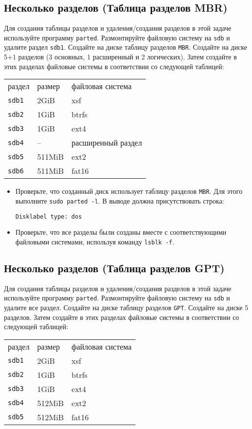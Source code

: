 \documentclass{article}
\begin{document}
\subsection{Несколько разделов (Таблица разделов MBR)}
Для создания таблицы разделов и удаления/создания разделов в этой задаче используйте программу \texttt{parted}. Размонтируйте файловую систему на \texttt{sdb} и удалите раздел \texttt{sdb1}. Создайте на диске таблицу разделов \texttt{MBR}. Создайте на диске 5+1 разделов (3 основных, 1 расширенный и 2 логических). Затем создайте в этих разделах файловые системы в соответствии со следующей таблицей:
\begin{center}
\begin{tabular}{lll}
 раздел & размер  	& файловая система   \\
 \texttt{sdb1} 	& 2GiB 		& xsf   \\
 \texttt{sdb2} 	& 1GiB 		& btrfs \\
 \texttt{sdb3} 	& 1GiB 		& ext4 \\
 \texttt{sdb4} 	& --	    & расширенный раздел \\
 \texttt{sdb5} 	& 511MiB 		& ext2 \\
 \texttt{sdb6} 	& 511MiB 		& fat16 \\
\end{tabular}
\end{center}

\begin{itemize}
\item Проверьте, что созданный диск использует таблицу разделов \texttt{MBR}. Для этого выполните \texttt{sudo parted -l}. В выводе должна присутствовать строка:
\begin{lstlisting}
Disklabel type: dos
\end{lstlisting}
\item Проверьте, что все разделы были созданы вместе с соответствующими файловыми системами, используя команду \texttt{lsblk -f}.
\end{itemize}


\subsection{Несколько разделов (Таблица разделов GPT)}
Для создания таблицы разделов и удаления/создания разделов в этой задаче используйте программу \texttt{parted}. Размонтируйте файловую систему на \texttt{sdb} и удалите все раздел. Создайте на диске таблицу разделов \texttt{GPT}. Создайте на диске 5 разделов. Затем создайте в этих разделах файловые системы в соответствии со следующей таблицей:
\begin{center}
\begin{tabular}{lll}
 раздел & размер  	& файловая система   \\
 \texttt{sdb1} 	& 2GiB 		& xsf   \\
 \texttt{sdb2} 	& 1GiB 		& btrfs \\
 \texttt{sdb3} 	& 1GiB 		& ext4 \\
 \texttt{sdb4} 	& 512MiB 	& ext2 \\
 \texttt{sdb5} 	& 512MiB 	& fat16 \\
\end{tabular}
\end{center}
\end{document}

